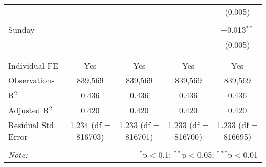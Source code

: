 \documentclass[
]{article}
\begin{document}
\begin{table}[!htbp]
{\begin{tabular}{@{\extracolsep{5pt}}lcccc}
  &  &  &  & (0.005) \\ 
  & & & & \\ 
 Sunday &  &  &  & $-$0.013$^{**}$ \\ 
  &  &  &  & (0.005) \\ 
  & & & & \\ 
\hline \\[-1.8ex] 
Individual FE & Yes & Yes & Yes & Yes \\ 
Observations & 839,569 & 839,569 & 839,569 & 839,569 \\ 
R$^{2}$ & 0.436 & 0.436 & 0.436 & 0.436 \\ 
Adjusted R$^{2}$ & 0.420 & 0.420 & 0.420 & 0.420 \\ 
Residual Std. Error & 1.234 (df = 816703) & 1.233 (df = 816701) & 1.233 (df = 816700) & 1.233 (df = 816695) \\ 
\hline 
\hline \\[-1.8ex] 
\textit{Note:}  & \multicolumn{4}{r}{$^{*}$p$<$0.1; $^{**}$p$<$0.05; $^{***}$p$<$0.01} \\ 
\end{tabular}
} 
\end{table} 
\newpage
\end{document}
